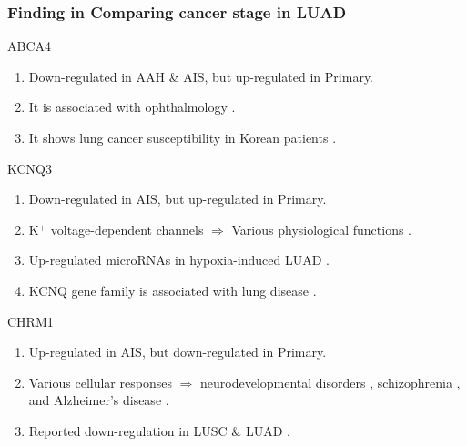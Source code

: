 \documentclass{beamer}
\begin{document}
    \begin{frame}[allowframebreaks]
        \frametitle{Finding in Comparing cancer stage in LUAD}

        \begin{block}{ABCA4}
            \begin{enumerate}
                \item Down-regulated in AAH \& AIS, but up-regulated in Primary.
                \item It is associated with ophthalmology \cite{ABCA4-2}.
                \item It shows lung cancer susceptibility in Korean patients \cite{ABCA4-1}.
            \end{enumerate}
        \end{block}

        \begin{block}{KCNQ3}
            \begin{enumerate}
                \item Down-regulated in AIS, but up-regulated in Primary.
                \item K$^+$ voltage-dependent channels $ \Rightarrow $ Various physiological functions \cite{KCNQ3-1, KCNQ3-2, KCNQ3-3}.
                \item Up-regulated microRNAs in hypoxia-induced LUAD \cite{KCNQ3-4}.
                \item KCNQ gene family is associated with lung disease \cite{KCNQ3-5}.
            \end{enumerate}
        \end{block}

        \begin{block}{CHRM1}
            \begin{enumerate}
                \item Up-regulated in AIS, but down-regulated in Primary.
                \item Various cellular responses $\Rightarrow$ neurodevelopmental disorders \cite{CHRM1-1}, schizophrenia \cite{CHRM1-2}, and Alzheimer's disease \cite{CHRM1-3}.
                \item Reported down-regulation in LUSC \& LUAD \cite{CHRM1-4}.
            \end{enumerate}
        \end{block}
    \end{frame}
\end{document}
